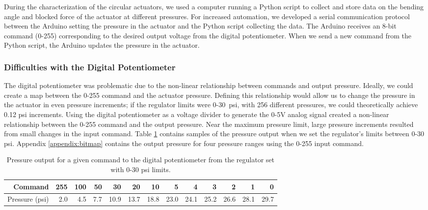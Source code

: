 During the characterization of the circular actuators, we used a computer running a Python script to collect and store data on the bending angle and blocked force of the actuator at different pressures. For increased automation, we developed a serial communication protocol between the Arduino setting the pressure in the actuator and the Python script collecting the data. The Arduino receives an 8-bit command (0-255) corresponding to the desired output voltage from the digital potentiometer. When we send a new command from the Python script, the Arduino updates the pressure in the actuator. 

\subsubsection{Difficulties with the Digital Potentiometer}

The digital potentiometer was problematic due to the non-linear relationship between commands and output pressure. Ideally, we could create a map between the 0-255 command and the actuator pressure. Defining this relationship would allow us to change the pressure in the actuator in even pressure increments; if the regulator limits were 0-30~psi, with 256 different pressures, we could theoretically achieve 0.12 psi increments. Using the digital potentiometer as a voltage divider to generate the 0-5V analog signal created a non-linear relationship between the 0-255 command and the output pressure. Near the maximum pressure limit, large pressure increments resulted from small changes in the input command. Table \ref{table:bitmap} contains samples of the pressure output when we set the regulator's limits between 0-30 psi. Appendix \ref{appendix:bitmap} contains the output pressure for four pressure ranges using the 0-255 input command. \\

\begin{table}[ht]
    \centering
    \begin{tabular}{|r|r|r|r|r|r|r|r|r|r|r|r|r|}
        \hline
        Command  & 255 & 100 & 50  & 30   & 20   & 10   & 5    & 4    & 3    & 2    & 1    & 0    \\ \hline
        Pressure (psi) & 2.0 & 4.5 & 7.7 & 10.9 & 13.7 & 18.8 & 23.0 & 24.1 & 25.2 & 26.6 & 28.1 & 29.7 \\ \hline
    \end{tabular}
    \caption{Pressure output for a given command to the digital potentiometer from the regulator set with 0-30 psi limits.}
    \label{table:bitmap}
\end{table}

